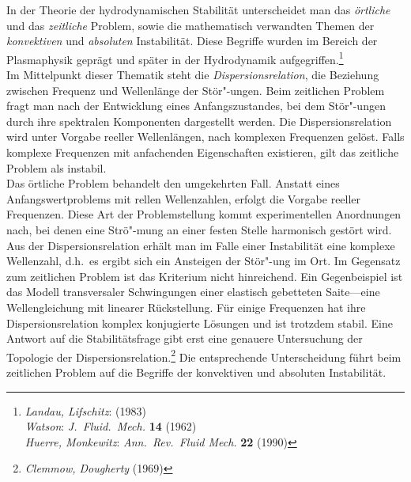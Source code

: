 \documentclass[10pt,a5paper,oneside,draft]{book}
\numberwithin{equation}{chapter}
\def\bibspace{\hspace*{18pt}}
\def\bibspace{\hspace*{21pt}}
\begin{document}
In der Theorie der hydrodynamischen Stabilit\"at unterscheidet man das \textit{\"ortliche} und das \textit{zeitliche} Problem, sowie die mathematisch verwandten Themen der \textit{konvektiven} und \textit{absoluten} Instabilit\"at.
Diese Begriffe wurden im Bereich der Plasmaphysik gepr\"agt und sp\"ater in der Hydrodynamik aufgegriffen.\footnote{\textsl{Landau, Lifschitz}: (1983)\\\bibspace\label{bib:watson_j}\textsl{Watson}: \textit{J.\ Fluid.\ Mech.} \textbf{14} (1962)\\\bibspace\label{bib:huerre_monkewitz}\textsl{Huerre, Monkewitz}: \textit{Ann.\ Rev.\ Fluid Mech.} \textbf{22} (1990)}\\
Im Mittelpunkt dieser Thematik steht die \textit{Dispersionsrelation}, die Beziehung zwischen Frequenz und Wellenl\"ange der St\"or"-ungen.
Beim zeitlichen Problem fragt man nach der Entwicklung eines Anfangszustandes, bei dem St\"or"-ungen durch ihre spektralen Komponenten dargestellt werden.
Die Dispersionsrelation wird unter Vorgabe reeller Wellenl\"angen, nach komplexen Frequenzen gel\"ost.
Falls komplexe Frequenzen mit anfachenden Eigenschaften existieren, gilt das zeitliche Problem als instabil.\\
Das \"ortliche Problem behandelt den umgekehrten Fall.
Anstatt eines Anfangswertproblems mit rellen Wellenzahlen, erfolgt die Vorgabe reeller Frequenzen.
Diese Art der Problemstellung kommt experimentellen Anordnungen nach, bei denen eine Str\"o"-mung an einer festen Stelle harmonisch gest\"ort wird.
Aus der Dispersionsrelation erh\"alt man im Falle einer Instabilit\"at eine komplexe Wellenzahl, d.h.\ es ergibt sich ein Ansteigen der St\"or"-ung im Ort.
Im Gegensatz zum zeitlichen Problem ist das Kriterium nicht hinreichend.
Ein Gegenbeispiel ist das Modell transversaler Schwingungen einer elastisch gebetteten Saite---eine Wellengleichung mit linearer R\"uckstellung.
F\"ur einige Frequenzen hat ihre Dispersionsrelation komplex konjugierte L\"osungen und ist trotzdem stabil.
Eine Antwort auf die Stabilit\"atsfrage gibt erst eine genauere Untersuchung der Topologie der Dispersionsrelation.\footnote{\textsl{Clemmow, Dougherty} (1969)}
Die entsprechende Unterscheidung f\"uhrt beim zeitlichen Problem auf die Begriffe der konvektiven und absoluten Instabilit\"at.\\
\end{document}
